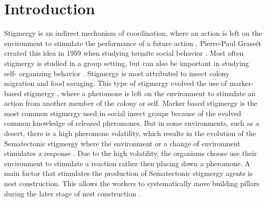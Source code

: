 \section{Introduction}

Stigmergy is an indirect mechanism of coordination, where an action is left on the environment to stimulate the performance of a future action \cite{susi_social_2001, ahadeli_multi-agent_2004}.
Pierre-Paul Grassét created this idea in 1959 when studying termite social behavior \cite{heylighen_stigmergy_2016a}.
Most often stigmergy is studied in a group setting, but can also be important in studying self- organizing behavior \cite{heylighen_stigmergy_2016b}.
Stigmergy is most attributed to insect colony migration and food savaging.
This type of stigmergy evolved the use of marker-based stigmergy \cite{ahadeli_multi-agent_2004, heylighen_stigmergy_2016b}, where a pheromone is left on the environment to stimulate an action from another member of the colony or self.
Marker based stigmergy is the most common stigmergy used in social insect groups because of the evolved common knowledge of released pheromones.
But in some environments, such as a desert, there is a high pheromone volatility, which results in the evolution of the Sematectonic stigmergy where the environment or a change of environment stimulates a response \cite{ahadeli_multi-agent_2004, heylighen_stigmergy_2016a}.
Due to the high volatility, the organisms choose use their environment to stimulate a reaction rather then placing down a pheromone.
A main factor that stimulates the production of Sematectonic stigmergy agents is nest construction. This allows the workers to systematically move building pillars during the later stage of nest construction \cite{dorigo_ant_2000,khuong_stigmergic_2016}.

